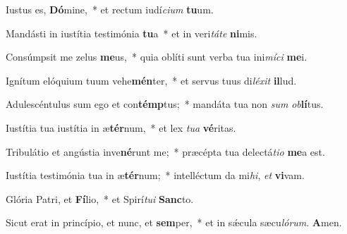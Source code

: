 \item Iustus es, \textbf{Dó}mine,~* et rectum iudí\textit{cium} \textbf{tu}um.

\item Mandásti in iustítia testimónia \textbf{tu}a~* et in veri\textit{táte} \textbf{ni}mis.

\item Consúmpsit me zelus \textbf{me}us,~* quia oblíti sunt verba tua ini\textit{míci} \textbf{me}i.

\item Ignítum elóquium tuum vehe\textbf{mén}ter,~* et servus tuus di\textit{léxit} \textbf{il}lud.

\item Adulescéntulus sum ego et con\textbf{témp}tus;~* mandáta tua non \textit{sum} \textit{ob}\textbf{lí}tus.

\item Iustítia tua iustítia in æ\textbf{tér}num,~* et lex \textit{tua} \textbf{vé}ritas.

\item Tribulátio et angústia inve\textbf{né}runt me;~* præcépta tua delectá\textit{tio} \textbf{me}a est.

\item Iustítia testimónia tua in æ\textbf{tér}num;~* intelléctum da mi\textit{hi}, \textit{et} \textbf{vi}vam.

\item Glória Patri, et \textbf{Fí}lio,~* et Spirí\textit{tui} \textbf{Sanc}to.

\item Sicut erat in princípio, et nunc, et \textbf{sem}per,~* et in sǽcula sæcu\textit{lórum}. \textbf{A}men.